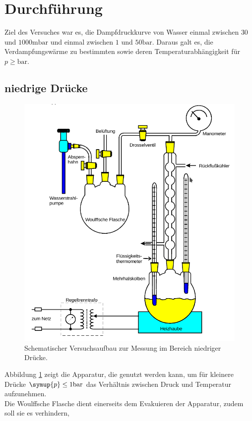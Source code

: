\section{Durchführung}
\label{sec:Durchführung}
Ziel des Versuches war es, die Dampfdruckkurve von Wasser einmal zwischen $30$ und $1000 \si{\milli\bar}$
und einmal zwischen $1$ und $50 \si{\bar}$. Daraus galt es, die Verdampfungswärme zu bestimmten
sowie deren Temperaturabhängigkeit für $p \geq \si{\bar}$.

\subsection{niedrige Drücke}
\begin{figure}
    \centering
    \includegraphics[width=\textwidth]{apparatur1.png}
    \caption{Schematischer Versuchsaufbau zur Messung im Bereich niedriger Drücke.}
    \label{fig:app1}
\end{figure}
Abbildung \ref{fig:app1} zeigt die Apparatur, die genutzt werden kann, um für kleinere Drücke $\symup{p} \leq 1 \si{\bar}$
das Verhältnis zwischen Druck und Temperatur aufzunehmen. \\
Die Woulffsche Flasche dient einerseits dem Evakuieren der Apparatur, zudem soll sie es verhindern,
